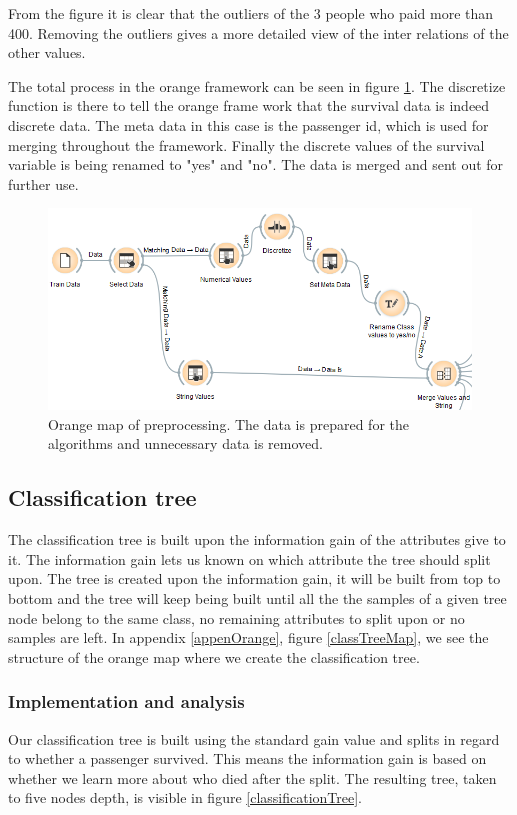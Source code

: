\documentclass[a4paper,11pt]{article}
\begin{document}
From the figure it is clear that the outliers of the 3 people who paid more than 400. Removing the outliers gives a more detailed view of the inter relations of the other values.

The total process in the orange framework can be seen in figure \ref{preprocessMap}. The discretize function is there to tell the orange frame work that the survival data is indeed discrete data. The meta data in this case is the passenger id, which is used for merging throughout the framework. Finally the discrete values of the survival variable is being renamed to "yes" and "no". The data is merged and sent out for further use.

\begin{figure}[h]
	\begin{center}
	\includegraphics[scale=0.7]{PreprocessMap}
	\end{center}
	\caption{Orange map of preprocessing. The data is prepared for the algorithms and unnecessary data is removed.}
	\label{preprocessMap}
\end{figure}

\subsection{Classification tree}
The classification tree\cite{ClassificationTree} is built upon the information gain of the attributes give to it. The information gain lets us known on which attribute the tree should split upon.
The tree is created upon the information gain, it will be built from top to bottom and the tree will keep being built until all the the samples of a given tree node belong to the same class, no remaining attributes to split upon or no samples are left. In appendix \ref{appenOrange}, figure \ref{classTreeMap}, we see the structure of the orange map where we create the classification tree. 

\subsubsection{Implementation and analysis}
Our classification tree is built using the standard gain value and splits in regard to whether a passenger survived. This means the information gain is based on whether we learn more about who died after the split. The resulting tree, taken to five nodes depth, is visible in figure \ref{classificationTree}.
\end{document}
